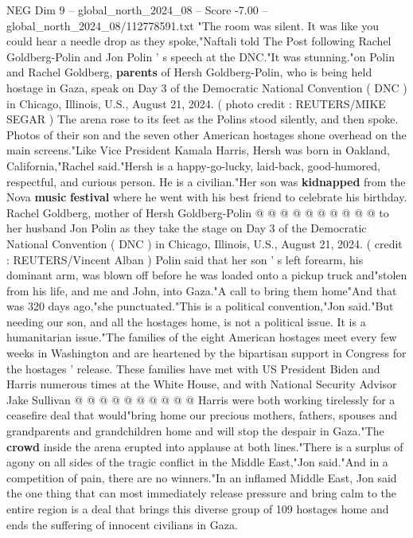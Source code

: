 \begin{textsample}{NEG Dim 9 – global\_north\_2024\_08 – Score -7.00 – global\_north\_2024\_08/112778591.txt}  \label{ex:f9_neg_089}
"The room was silent.
It was like you could hear a needle drop as they spoke,"Naftali told The Post following Rachel Goldberg-Polin and Jon Polin ' s speech at the DNC."It was stunning."on Polin and Rachel Goldberg, \textbf{parents} of Hersh Goldberg-Polin, who is being held hostage in Gaza, speak on Day 3 of the Democratic National Convention ( DNC ) in Chicago, Illinois, U.S., August 21, 2024. ( photo credit : REUTERS/MIKE SEGAR ) The arena rose to its feet as the Polins stood silently, and then spoke.
Photos of their son and the seven other American hostages shone overhead on the main screens."Like Vice President Kamala Harris, Hersh was born in Oakland, California,"Rachel said."Hersh is a happy-go-lucky, laid-back, good-humored, respectful, and curious person.
He is a civilian."Her son was \textbf{kidnapped} from the Nova \textbf{music} \textbf{festival} where he went with his best friend to celebrate his birthday.
Rachel Goldberg, mother of Hersh Goldberg-Polin @ @ @ @ @ @ @ @ @ @ to her husband Jon Polin as they take the stage on Day 3 of the Democratic National Convention ( DNC ) in Chicago, Illinois, U.S., August 21, 2024. ( credit : REUTERS/Vincent Alban ) Polin said that her son ' s left forearm, his dominant arm, was blown off before he was loaded onto a pickup truck and"stolen from his life, and me and John, into Gaza."A call to bring them home"And that was 320 days ago,"she punctuated."This is a political convention,"Jon said."But needing our son, and all the hostages home, is not a political issue.
It is a humanitarian issue."The families of the eight American hostages meet every few weeks in Washington and are heartened by the bipartisan support in Congress for the hostages ' release.
These families have met with US President Biden and Harris numerous times at the White House, and with National Security Advisor Jake Sullivan @ @ @ @ @ @ @ @ @ @ Harris were both working tirelessly for a ceasefire deal that would"bring home our precious mothers, fathers, spouses and grandparents and grandchildren home and will stop the despair in Gaza."The \textbf{crowd} inside the arena erupted into applause at both lines."There is a surplus of agony on all sides of the tragic conflict in the Middle East,"Jon said."And in a competition of pain, there are no winners."In an inflamed Middle East, Jon said the one thing that can most immediately release pressure and bring calm to the entire region is a deal that brings this diverse group of 109 hostages home and ends the suffering of innocent civilians in Gaza.

\end{textsample}
